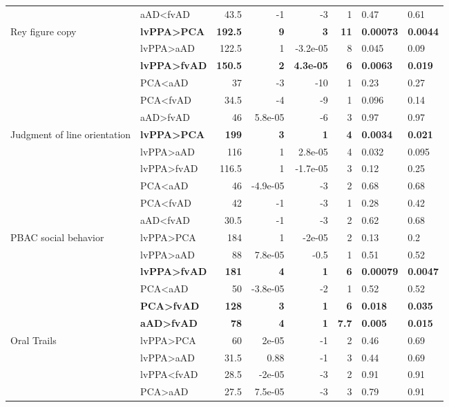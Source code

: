 \documentclass[]{article}
\begin{document}
\begin{table}[ht]
{\begin{tabular}{llrrrrll}
   & aAD<fvAD & 43.5 & -1 & -3 & 1 & 0.47 & 0.61 \\ 
  Rey figure copy & \textbf{lvPPA>PCA} & \textbf{192.5} & \textbf{9} & \textbf{3} & \textbf{11} & \textbf{0.00073} & \textbf{0.0044} \\ 
   & lvPPA>aAD & 122.5 & 1 & -3.2e-05 & 8 & 0.045 & 0.09 \\ 
   & \textbf{lvPPA>fvAD} & \textbf{150.5} & \textbf{2} & \textbf{4.3e-05} & \textbf{6} & \textbf{0.0063} & \textbf{0.019} \\ 
   & PCA<aAD & 37 & -3 & -10 & 1 & 0.23 & 0.27 \\ 
   & PCA<fvAD & 34.5 & -4 & -9 & 1 & 0.096 & 0.14 \\ 
   & aAD>fvAD & 46 & 5.8e-05 & -6 & 3 & 0.97 & 0.97 \\ 
  Judgment of line orientation & \textbf{lvPPA>PCA} & \textbf{199} & \textbf{3} & \textbf{1} & \textbf{4} & \textbf{0.0034} & \textbf{0.021} \\ 
   & lvPPA>aAD & 116 & 1 & 2.8e-05 & 4 & 0.032 & 0.095 \\ 
   & lvPPA>fvAD & 116.5 & 1 & -1.7e-05 & 3 & 0.12 & 0.25 \\ 
   & PCA<aAD & 46 & -4.9e-05 & -3 & 2 & 0.68 & 0.68 \\ 
   & PCA<fvAD & 42 & -1 & -3 & 1 & 0.28 & 0.42 \\ 
   & aAD<fvAD & 30.5 & -1 & -3 & 2 & 0.62 & 0.68 \\ 
  PBAC social behavior & lvPPA>PCA & 184 & 1 & -2e-05 & 2 & 0.13 & 0.2 \\ 
   & lvPPA>aAD & 88 & 7.8e-05 & -0.5 & 1 & 0.51 & 0.52 \\ 
   & \textbf{lvPPA>fvAD} & \textbf{181} & \textbf{4} & \textbf{1} & \textbf{6} & \textbf{0.00079} & \textbf{0.0047} \\ 
   & PCA<aAD & 50 & -3.8e-05 & -2 & 1 & 0.52 & 0.52 \\ 
   & \textbf{PCA>fvAD} & \textbf{128} & \textbf{3} & \textbf{1} & \textbf{6} & \textbf{0.018} & \textbf{0.035} \\ 
   & \textbf{aAD>fvAD} & \textbf{78} & \textbf{4} & \textbf{1} & \textbf{7.7} & \textbf{0.005} & \textbf{0.015} \\ 
  Oral Trails & lvPPA>PCA & 60 & 2e-05 & -1 & 2 & 0.46 & 0.69 \\ 
   & lvPPA>aAD & 31.5 & 0.88 & -1 & 3 & 0.44 & 0.69 \\ 
   & lvPPA<fvAD & 28.5 & -2e-05 & -3 & 2 & 0.91 & 0.91 \\ 
   & PCA>aAD & 27.5 & 7.5e-05 & -3 & 3 & 0.79 & 0.91 \\ 

\end{tabular}}
\end{table}
\end{document}
